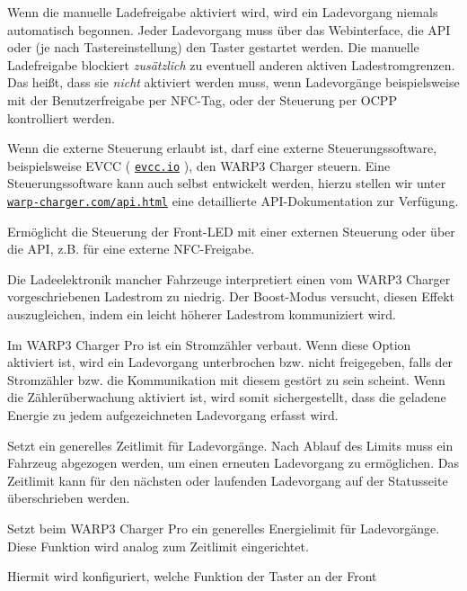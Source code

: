 \documentclass[a4paper,10pt]{article}
\newcommand\rurl[2]{%
  \href{#1}{\nolinkurl{#2}}%
}
\begin{document}
\begin{multicols*}{2}
    \begin{description}[labelindent=0.5cm, leftmargin=0.5cm]
     \item[Manuelle Ladefreigabe] Wenn die manuelle Ladefreigabe aktiviert wird, wird ein Ladevorgang niemals automatisch begonnen. Jeder Ladevorgang muss über das Webinterface, die API oder (je nach Tastereinstellung) den Taster gestartet werden. Die manuelle Ladefreigabe blockiert \textit{zusätzlich} zu eventuell anderen aktiven Ladestromgrenzen. Das heißt, dass sie \textit{nicht} aktiviert werden muss, wenn Ladevorgänge beispielsweise mit der Benutzerfreigabe per NFC-Tag, oder der Steuerung per OCPP kontrolliert werden.
     \item[Externe Steuerung] Wenn die externe Steuerung erlaubt ist, darf eine externe Steuerungssoftware, beispielsweise
     EVCC (\rurl{https://evcc.io}{evcc.io}), den WARP3 Charger steuern. Eine Steuerungssoftware kann auch selbst entwickelt werden, hierzu stellen
     wir unter \rurl{https://warp-charger.com/api.html}{warp-charger.com/api.html} eine detaillierte API-Dokumentation zur Verfügung.
     \item[Status-LED-Steuerung] Ermöglicht die Steuerung der Front-LED mit einer externen Steuerung oder über die API, z.B. für eine externe NFC-Freigabe.
     \item[Boost-Modus] Die Ladeelektronik mancher Fahrzeuge interpretiert einen vom WARP3 Charger vorgeschriebenen Ladestrom zu niedrig. Der Boost-Modus versucht, diesen Effekt auszugleichen, indem ein leicht höherer Ladestrom kommuniziert wird.
     \item[Zählerüberwachung] Im WARP3 Charger Pro ist ein Stromzähler verbaut. Wenn diese Option aktiviert ist, wird ein Ladevorgang unterbrochen bzw. nicht freigegeben, falls der Stromzähler bzw. die Kommunikation mit diesem gestört zu sein scheint. Wenn die Zählerüberwachung aktiviert ist, wird somit sichergestellt, dass die geladene Energie zu jedem aufgezeichneten Ladevorgang erfasst wird.
     \item[Zeitlimit] Setzt ein generelles Zeitlimit für Ladevorgänge. Nach Ablauf des Limits muss ein Fahrzeug abgezogen werden, um einen erneuten Ladevorgang zu ermöglichen. Das Zeitlimit kann für den nächsten oder laufenden Ladevorgang auf der Statusseite überschrieben werden.
     \item[Energielimit] Setzt beim WARP3 Charger Pro ein generelles Energielimit für Ladevorgänge. Diese Funktion wird analog zum Zeitlimit eingerichtet.
     \item[Tastereinstellung] Hiermit wird konfiguriert, welche Funktion der Taster an der Front

\end{description}
\end{multicols*}
\end{document}
